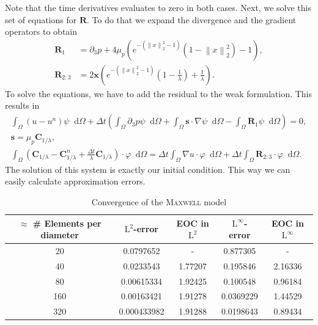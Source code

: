 \documentclass[12pt,a4paper,twoside, open=right]{scrreprt}
\theoremstyle{definition}
\theoremstyle{plain}
\newcommand{\norm}[1]{\left\lVert#1\right\rVert}
\newcommand{\bfs}{\bm{s}}
\newcommand{\bfC}{\bm{C}}
\newcommand{\bfx}{\bm{x}}
\newcommand{\bfR}{\bm{R}}
\newcommand{\D}{\mathop{}\!\mathrm{d}}
\begin{document}
Note that the time derivatives evaluates to zero in both cases. Next, we solve this set of equations for $\bfR$. To do that we expand the divergence and the gradient operators to obtain
\begin{align}
\bfR_1 &= \partial_3 p +4\mu_p(e^{-(\norm{x}_2^2 -1)}(1-\norm{x}_2^2)-1),\\
\bfR_{2:3} &=2\bfx\left(e^{-(\norm{x}_2^2 -1)}\left(1-\frac{1}{\lambda}\right)+\frac{1}{\lambda}\right).
\end{align}
To solve the equations, we have to add the residual to the weak formulation. This results in 
\begin{align}
\int_\Omega(u-u^n)\psi\D\Omega +\Delta t\left(\int_\Omega\partial_3 p\psi\D\Omega + \int_\Omega\bfs\cdot\nabla\psi\D\Omega-\int_\Omega \bfR_1\psi\D\Omega\right) = 0,\\
\bfs =\mu_p\bfC_{1/\lambda},\\
\int_\Omega(\bfC_{1/\lambda} - \bfC_{1/\lambda}^n +\frac{\Delta t}{\lambda}\bfC_{1/\lambda})\cdot\varphi\D\Omega = 
\Delta t\int_\Omega \nabla u\cdot\varphi\D\Omega+\Delta t\int_{\Omega}\bfR_{2:3}\cdot\varphi\D\Omega.
\end{align}
The solution of this system is exactly our initial condition. This way we can easily calculate approximation errors. 
\begin{table}
    \centering
    \begin{tabular}{c|c|c|c|c}
        $\approx$ \# Elements per diameter& $\mathrm{L}^2$-error&EOC in $\mathrm{L}^2$&$\mathrm{L}^\infty$-error &EOC in $\mathrm{L}^\infty$\\
        \hline
        20 & 0.0797652 & - & 0.877305 & -\\
        40 & 0.0233543 & 1.77207 & 0.195846 & 2.16336\\
        80 & 0.00615334 & 1.92425 & 0.100548 & 0.96184\\
        160 & 0.00163421 & 1.91278 & 0.0369229 & 1.44529\\
        320 & 0.000433982 & 1.91288 & 0.0198643 & 0.89434
    \end{tabular}
    \caption{Convergence of the \textsc{Maxwell} model}
    \label{tab:maxwellconv}
\end{table}
\end{document}
